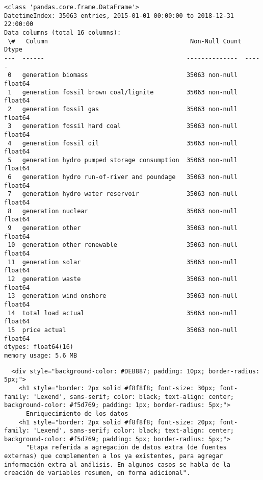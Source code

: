 \documentclass[11pt]{article}
\begin{document}
    \begin{Verbatim}[commandchars=\\\{\}]
<class 'pandas.core.frame.DataFrame'>
DatetimeIndex: 35063 entries, 2015-01-01 00:00:00 to 2018-12-31 22:00:00
Data columns (total 16 columns):
 \#   Column                                       Non-Null Count  Dtype
---  ------                                       --------------  -----
 0   generation biomass                           35063 non-null  float64
 1   generation fossil brown coal/lignite         35063 non-null  float64
 2   generation fossil gas                        35063 non-null  float64
 3   generation fossil hard coal                  35063 non-null  float64
 4   generation fossil oil                        35063 non-null  float64
 5   generation hydro pumped storage consumption  35063 non-null  float64
 6   generation hydro run-of-river and poundage   35063 non-null  float64
 7   generation hydro water reservoir             35063 non-null  float64
 8   generation nuclear                           35063 non-null  float64
 9   generation other                             35063 non-null  float64
 10  generation other renewable                   35063 non-null  float64
 11  generation solar                             35063 non-null  float64
 12  generation waste                             35063 non-null  float64
 13  generation wind onshore                      35063 non-null  float64
 14  total load actual                            35063 non-null  float64
 15  price actual                                 35063 non-null  float64
dtypes: float64(16)
memory usage: 5.6 MB
    \end{Verbatim}

    \begin{verbatim}
  <div style="background-color: #DEB887; padding: 10px; border-radius: 5px;">
    <h1 style="border: 2px solid #f8f8f8; font-size: 30px; font-family: 'Lexend', sans-serif; color: black; text-align: center; background-color: #f5d769; padding: 1px; border-radius: 5px;">
      Enriquecimiento de los datos
    <h1 style="border: 2px solid #f8f8f8; font-size: 20px; font-family: 'Lexend', sans-serif; color: black; text-align: center; background-color: #f5d769; padding: 5px; border-radius: 5px;">
      "Etapa referida a agregación de datos extra (de fuentes externas) que complementen a los ya existentes, para agregar información extra al análisis. En algunos casos se habla de la creación de variables resumen, en forma adicional".
\end{verbatim}
\end{document}
